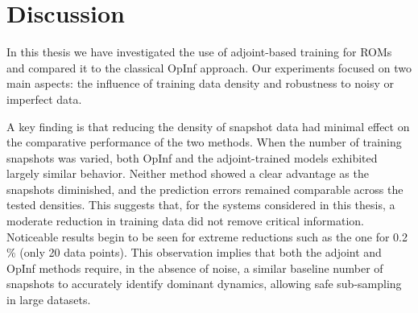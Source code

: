 
\chapter{Discussion}
\label{chap:discussion}
\vspace{-1.3cm}

In this thesis we have investigated the use of adjoint-based training for ROMs and compared it to the classical OpInf approach. Our experiments focused on two main aspects: the influence of training data density and robustness to noisy or imperfect data.

A key finding is that reducing the density of snapshot data had minimal effect on the comparative performance of the two methods. When the number of training snapshots was varied, both OpInf and the adjoint-trained models exhibited largely similar behavior. Neither method showed a clear advantage as the snapshots diminished, and the prediction errors remained comparable across the tested densities. This suggests that, for the systems considered in this thesis, a moderate reduction in training data did not remove critical information. Noticeable results begin to be seen for extreme reductions such as the one for 0.2 \% (only 20 data points). This observation implies that both the adjoint and OpInf methods require, in the absence of noise, a similar baseline number of snapshots to accurately identify dominant dynamics, allowing safe sub-sampling in large datasets.


